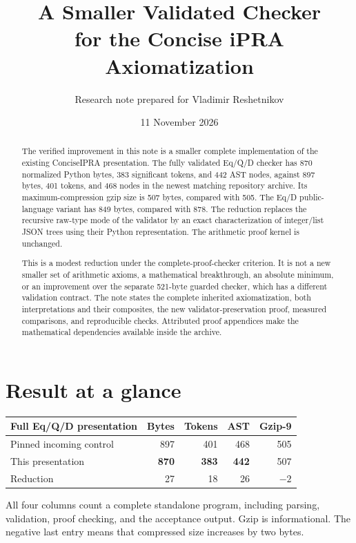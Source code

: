\documentclass[11pt,letterpaper]{article}
\title{\color{ink}A Smaller Validated Checker\\for the Concise iPRA Axiomatization}
\author{Research note prepared for Vladimir Reshetnikov}
\date{11 November 2026}
\theoremstyle{definition}
\theoremstyle{remark}
\begin{document}
\maketitle
\begin{abstract}
The verified improvement in this note is a smaller complete implementation
of the existing ConciseIPRA presentation. The fully validated Eq/Q/D checker
has 870 normalized Python bytes, 383 significant tokens, and 442 AST nodes,
against 897 bytes, 401 tokens, and 468 nodes in the newest matching
repository archive. Its maximum-compression gzip size is 507 bytes, compared
with 505. The Eq/D public-language variant has 849 bytes, compared with 878.
The reduction replaces the recursive raw-type mode of the validator by an
exact characterization of integer/list JSON trees using their Python
representation. The arithmetic proof kernel is unchanged.

This is a modest reduction under the complete-proof-checker criterion.
It is not a new smaller set of arithmetic axioms, a mathematical breakthrough,
an absolute minimum, or an improvement over the separate 521-byte guarded
checker, which has a different validation contract. The note states the
complete inherited axiomatization, both interpretations and their composites,
the new validator-preservation proof, measured comparisons, and reproducible
checks. Attributed proof appendices make the mathematical dependencies
available inside the archive.
\end{abstract}

\section*{Result at a glance}
\begin{center}
\begin{tabular}{lrrrr}
\toprule
Full Eq/Q/D presentation & Bytes & Tokens & AST & Gzip-9\\
\midrule
Pinned incoming control & 897 & 401 & 468 & 505\\
This presentation & \textbf{870} & \textbf{383} & \textbf{442} & 507\\
Reduction & 27 & 18 & 26 & $-2$\\
\bottomrule
\end{tabular}
\end{center}
All four columns count a complete standalone program, including parsing,
validation, proof checking, and the acceptance output. Gzip is informational.
The negative last entry means that compressed size increases by two bytes.
\end{document}
